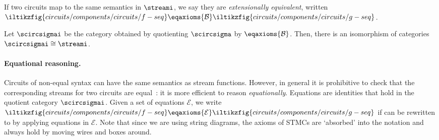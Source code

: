 \documentclass[10pt]{article}
\begin{document}
    \noindent
    If two circuits map to the same semantics in \(\streami\), we say they are \emph{extensionally equivalent}, written \(\iltikzfig{circuits/components/circuits/f-seq} \eqaxioms{\mathcal{B}} \iltikzfig{circuits/components/circuits/g-seq}\).

    \begin{theorem}
        Let \(\scircsigmai\) be the category obtained by quotienting \(\scircsigma\) by \(\eqaxioms{\mathcal{B}}\).
        Then, there is an isomorphism of categories \(\scircsigmai \cong \streami\).
    \end{theorem}

    \paragraph*{Equational reasoning.}

    Circuits of non-equal syntax can have the same semantics as stream functions.
    However, in general it is prohibitive to check that the corresponding streams for two circuits are equal~\cite{ghica2017diagrammatica}: it is more efficient to reason \emph{equationally}.
    Equations are identities that hold in the quotient category \(\scircsigmai\).
    Given a set of equations \(\mathcal{E}\), we write \(\iltikzfig{circuits/components/circuits/f-seq} \eqaxioms{\mathcal{E}} \iltikzfig{circuits/components/circuits/g-seq}\) if  can be rewritten to  by applying equations in \(\mathcal{E}\).
    Note that since we are using string diagrams, the axioms of STMCs are `absorbed' into the notation and always hold by moving wires and boxes around.
\end{document}
